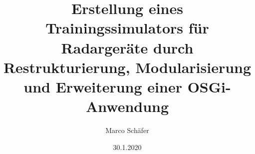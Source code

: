 \begin{titlepage}

\date{30.1.2020}
\author{Marco Schäfer}
\title{Erstellung eines Trainingssimulators für Radargeräte durch Restrukturierung, Modularisierung und Erweiterung einer OSGi-Anwendung}
\maketitle

\end{titlepage}